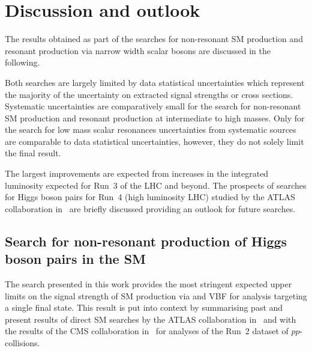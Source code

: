 \section{Discussion and outlook}%
\label{sec:result_discussion}


The results obtained as part of the searches for non-resonant SM \HH
production and resonant production via narrow width scalar bosons are
discussed in the following.

Both searches are largely limited by data statistical uncertainties
which represent the majority of the uncertainty on extracted signal
strengths or cross sections. Systematic uncertainties are
comparatively small for the search for non-resonant SM \HH production
and resonant production at intermediate to high masses. Only for the
search for low mass scalar resonances uncertainties from systematic
sources are comparable to data statistical uncertainties, however,
they do not solely limit the final result.

The largest improvements are expected from increases in the integrated
luminosity expected for Run~3 of the LHC and beyond. The prospects of
searches for Higgs boson pairs for Run~4 (high luminosity LHC) studied
by the ATLAS collaboration
in~\cite{ATL-PHYS-PUB-2021-044,ATL-PHYS-PUB-2022-005} are briefly
discussed providing an outlook for future searches.


\subsection{Search for non-resonant production of Higgs boson pairs in
  the SM}

The search presented in this work provides the most stringent expected
upper limits on the signal strength of SM \HH production via \ggF and
VBF for analysis targeting a single final state. This result is put
into context by summarising past and present results of direct SM \HH
searches by the ATLAS collaboration
in~ and with the results of the CMS
collaboration in~ for analyses of the Run~2
dataset of $pp$-collisions.

